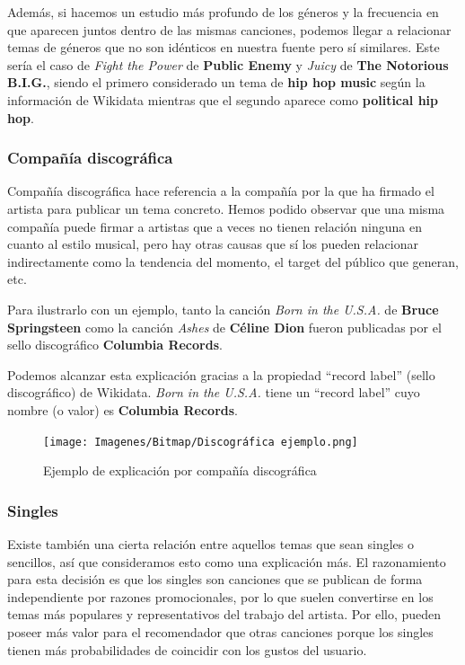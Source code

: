 Además, si hacemos un estudio más profundo de los géneros y la frecuencia en que aparecen juntos dentro de las mismas canciones, podemos llegar a relacionar temas de géneros que no son idénticos en nuestra fuente pero sí similares. Este sería el caso de \textit{Fight the Power} de \textbf{Public Enemy} y \textit{Juicy} de \textbf{The Notorious B.I.G.}, siendo el primero considerado un tema de \textbf{hip hop music} según la información de Wikidata mientras que el segundo aparece como \textbf{political hip hop}.

\subsubsection*{Compañía discográfica}

Compañía discográfica hace referencia a la compañía por la que ha firmado el artista para publicar un tema concreto. Hemos podido observar que una misma compañía puede firmar a artistas que a veces no tienen relación ninguna en cuanto al estilo musical, pero hay otras causas que sí los pueden relacionar indirectamente como la tendencia del momento, el target del público que generan, etc.

Para ilustrarlo con un ejemplo, tanto la canción \textit{Born in the U.S.A.} de \textbf{Bruce Springsteen} como la canción \textit{Ashes} de \textbf{Céline Dion} fueron publicadas por el sello discográfico \textbf{Columbia Records}.

Podemos alcanzar esta explicación gracias a la propiedad ``record label'' (sello discográfico) de Wikidata. \textit{Born in the U.S.A.} tiene un ``record label'' cuyo nombre (o valor) es \textbf{Columbia Records}.\\

\begin{figure}[h!]
	\centering
	\texttt{[image: Imagenes/Bitmap/Discográfica ejemplo.png]}
	\caption{Ejemplo de explicación por compañía discográfica}
	\label{fig:sampleImage}
\end{figure}

\subsubsection*{Singles}

Existe también una cierta relación entre aquellos temas que sean singles o sencillos, así que consideramos esto como una explicación más. El razonamiento para esta decisión es que los singles son canciones que se publican de forma independiente por razones promocionales, por lo que suelen convertirse en los temas más populares y representativos del trabajo del artista. Por ello, pueden poseer más valor para el recomendador que otras canciones porque los singles tienen más probabilidades de coincidir con los gustos del usuario.

